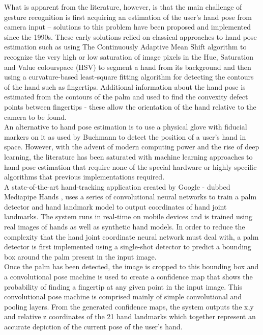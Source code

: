 What is apparent from the literature, however, is that the main challenge of gesture recognition is first acquiring an estimation of the user’s hand pose from camera input – solutions to this problem have been proposed and implemented since the 1990s. These early solutions \cite{hand_classical_approach} relied on classical approaches to hand pose estimation such as using The Continuously Adaptive Mean Shift algorithm to recognize the very high or low saturation of image pixels in the Hue, Saturation and Value colourspace (HSV) to segment a hand from its background and then using a curvature-based least-square fitting algorithm for detecting the contours of the hand such as fingertips. Additional information about the hand pose is estimated from the contours of the palm and used to find the convexity defect points between fingertips - these allow the orientation of the hand relative to the camera to be found. \\

An alternative to hand pose estimation is to use a physical glove with fiducial markers on it as used by Buchmann \cite{fingartips} to detect the position of a user’s hand in space. However, with the advent of modern computing power and the rise of deep learning, the literature has been saturated with machine learning approaches to hand pose estimation that require none of the special hardware or highly specific algorithms that previous implementations required. \\

A state-of-the-art hand-tracking application created by Google - dubbed Mediapipe Hands \cite{mediapipe_hands}, uses a series of convolutional neural networks to train a palm detector and hand landmark model to output coordinates of hand joint landmarks. The system runs in real-time on mobile devices and is trained using real images of hands as well as synthetic hand models. In order to reduce the complexity that the hand joint coordinate neural network must deal with, a palm detector is first implemented using a single-shot detector to predict a bounding box around the palm present in the input image.\\

Once the palm has been detected, the image is cropped to this bounding box and a convolutional pose machine is used to create a confidence map that shows the probability of finding a fingertip at any given point in the input image. This convolutional pose machine is comprised mainly of simple convolutional and pooling layers. From the generated confidence maps, the system outputs the x,y and relative z coordinates of the 21 hand landmarks which together represent an accurate depiction of the current pose of the user's hand. \\

